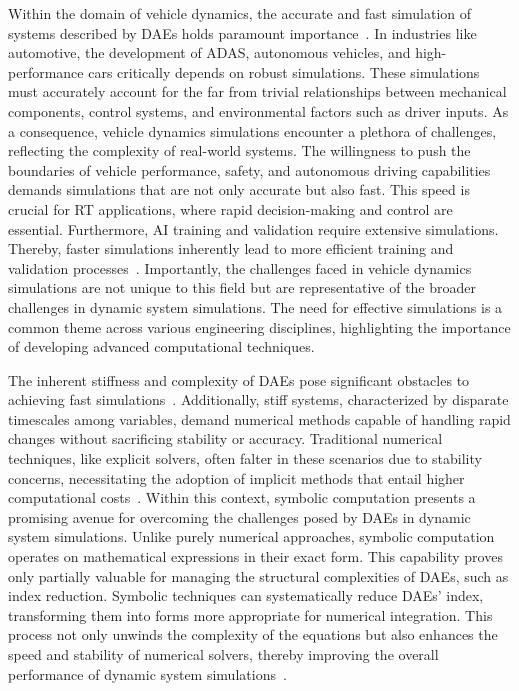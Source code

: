 Within the domain of vehicle dynamics, the accurate and fast simulation of systems described by \acp{DAE} holds paramount importance~\cite{burger2018dae,blundell2004multibody, dejalon1994kinematic, andreasson2016deployment, pankiewicz2003off}. In industries like automotive, the development of \ac{ADAS}, autonomous vehicles, and high-performance cars critically depends on robust simulations. These simulations must accurately account for the far from trivial relationships between mechanical components, control systems, and environmental factors such as driver inputs. As a consequence, vehicle dynamics simulations encounter a plethora of challenges, reflecting the complexity of real-world systems. The willingness to push the boundaries of vehicle performance, safety, and autonomous driving capabilities demands simulations that are not only accurate but also fast. This speed is crucial for \ac{RT} applications, where rapid decision-making and control are essential. Furthermore, \ac{AI} training and validation require extensive simulations. Thereby, faster simulations inherently lead to more efficient training and validation processes~\cite{piccinini2022predictive, piccinini2023physics}. Importantly, the challenges faced in vehicle dynamics simulations are not unique to this field but are representative of the broader challenges in dynamic system simulations. The need for effective simulations is a common theme across various engineering disciplines, highlighting the importance of developing advanced computational techniques.

The inherent stiffness and complexity of \acp{DAE} pose significant obstacles to achieving fast simulations~\cite{burger2018dae, blundell2004multibody, dejalon1994kinematic}. Additionally, stiff systems, characterized by disparate timescales among variables, demand numerical methods capable of handling rapid changes without sacrificing stability or accuracy. Traditional numerical techniques, like explicit solvers, often falter in these scenarios due to stability concerns, necessitating the adoption of implicit methods that entail higher computational costs~\cite{petzold1982differential, brenan1995numerical}. Within this context, symbolic computation presents a promising avenue for overcoming the challenges posed by \acp{DAE} in dynamic system simulations. Unlike purely numerical approaches, symbolic computation operates on mathematical expressions in their exact form. This capability proves only partially valuable for managing the structural complexities of \acp{DAE}, such as index reduction. Symbolic techniques can systematically reduce \acp{DAE}' index, transforming them into forms more appropriate for numerical integration. This process not only unwinds the complexity of the equations but also enhances the speed and stability of numerical solvers, thereby improving the overall performance of dynamic system simulations~\cite{petzold1982differential, brenan1995numerical, griepentrog1986differential}.


